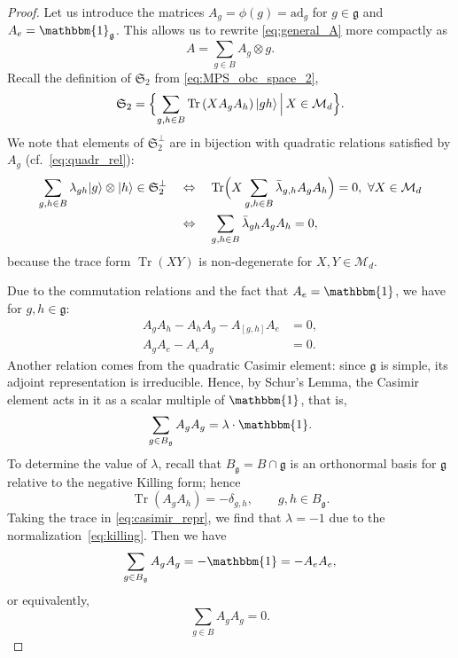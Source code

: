 \documentclass[a4paper]{article}
\newcommand{\ket}[1]{\vert #1 \rangle}
\newcommand{\tr}{\operatorname{Tr}}
\newcommand{\id}{\mathbbm{1}}
\newcommand{\ad}{\mathrm{ad}}
\theoremstyle{definition}
\begin{document}
\begin{proof}
Let us introduce the matrices $A_g=\phi(g)=\ad_g$ for $g\in\mathfrak{g}$ and $A_e=\id_{\mathfrak{g}}$. This allows us to rewrite \cref{eq:general_A} more compactly as
\begin{equation}\label{eq:general_Ae}
    A = \sum_{g\in B} A_g \otimes g .     
\end{equation}
Recall the definition of $\mathfrak{S}_2$ from \eqref{eq:MPS_obc_space_2},
\begin{equation*}
    \mathfrak{S}_2 = \Bigl\{\sum_{g,h\in B} \tr\left( X A_g A_h \right) \ket{gh} \,\Big|\, X\in \mathcal{M}_d\Bigr\}.
\end{equation*}
We note that elements of $\mathfrak{S}_2^\perp$ are in bijection with quadratic relations satisfied by $A_g$ (cf.\ \eqref{eq:quadr_rel}):
\begin{equation}\label{eq:quadr_rel2}
\begin{split}
    \sum_{g,h\in B} \lambda_{gh} \ket{g} \otimes \ket{h} \in \mathfrak{S}_2^\perp \quad &\Leftrightarrow \quad 
    \tr\Bigl( X \sum_{g,h\in B} \bar\lambda_{g,h} A_g A_h \Bigr) =0, \ \forall X\in\mathcal{M}_d \\ 
    &\Leftrightarrow \quad
    \sum_{g,h\in B} \bar{\lambda}_{gh} A_g A_h = 0,
\end{split}
\end{equation}
because the trace form $\tr(XY)$ is non-degenerate for $X,Y\in\mathcal{M}_d$. 

Due to the commutation relations and the fact that $A_e = \id$, we have for $g,h\in\mathfrak{g}$:
\begin{align}\label{eq:comm_rel2}
    A_g A_h - A_h A_g - A_{[g,h]} A_e &= 0, \\ \label{eq:comm_rel3}
    A_g A_e - A_e A_g &= 0.
\end{align}
Another relation comes from the quadratic Casimir element: since $\mathfrak{g}$ is simple, its adjoint representation is irreducible. Hence, by Schur's Lemma, the Casimir element acts in it as a scalar multiple of $\id$, that is,
\begin{equation}\label{eq:casimir_repr}
    \sum_{g\in B_\mathfrak{g}} A_g A_g = \lambda\cdot  \id.
\end{equation}
To determine the value of $\lambda$, recall that $B_{\mathfrak g} = B\cap \mathfrak{g}$ is an orthonormal basis for $\mathfrak{g}$ relative to the negative Killing form; hence
\begin{equation}\label{eq:killing}
\tr(A_g A_h) = -\delta_{g,h}, \qquad g,h\in B_{\mathfrak{g}}.
\end{equation}
Taking the trace in \cref{eq:casimir_repr}, we find that $\lambda = -1$ due to the normalization~\eqref{eq:killing}.  Then we have
\begin{equation}\label{eq:quadr_rel3}
    \sum_{g\in B_{\mathfrak{g}}} A_g A_g = -\id = -A_e A_e,
\end{equation}
or equivalently,
\begin{equation}\label{eq:quadr_rel3e}
    \sum_{g\in B} A_g A_g = 0.
\end{equation}


\end{proof}
\end{document}
